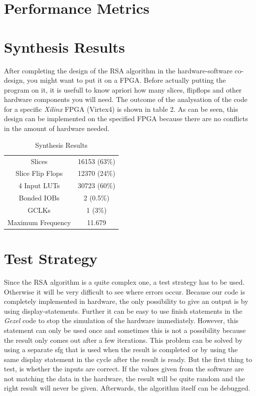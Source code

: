 \documentclass[a4paper]{article}
\begin{document}
\section{Performance Metrics}


\section{Synthesis Results}

After completing the design of the RSA algorithm in the hardware-software co-design, you might want to put it on a FPGA. Before actually putting the program on it, it is usefull to know apriori how many slices, flipflops and other hardware components you will need. The outcome of the analysation of the code for a specific \textit{Xilinx} FPGA (Virtex4) is shown in table 2. As can be seen, this design can be implemented on the specified FPGA because there are no conflicts in the amount of hardware needed.

\begin{table}[ht]
	\begin{center}	
		\begin{tabular}{c|c}
			Slices & 16153 (63\%)\\
			Slice Flip Flops & 12370 (24\%)\\
			4 Input LUTs & 30723 (60\%)\\
			Bonded IOBs & 2 (0.5\%)\\
			GCLKs & 1 (3\%)\\
			Maximum Frequency & 11.679 \mega \hertz
		\end{tabular}
	\end{center}
	\caption{Synthesis Results}
	\label{tab:synthesis results}
\end{table} 

\section{Test Strategy}

Since the RSA algorithm is a quite complex one, a test strategy has to be used. Otherwise it will be very difficult to see where errors occur. Because our code is completely implemented in hardware, the only possibility to give an output is by using display-statements. Further it can be easy to use finish statements in the \textit{Gezel} code to stop the simulation of the hardware immediately. However, this statement can only be used once and sometimes this is not a possibility because the result only comes out after a few iterations. This problem can be solved by using a separate sfg that is used when the result is completed or by using the same display statement in the cycle after the result is ready. But the first thing to test, is whether the inputs are correct. If the values given from the software are not matching the data in the hardware, the result will be quite random and the right result will never be given. Afterwards, the algorithm itself can be debugged.\\
\end{document}
